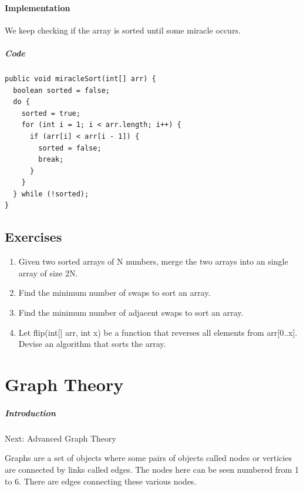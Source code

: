\documentclass[11pt,oneside]{book}
\begin{document}
\subsection{Implementation}

We keep checking if the array is sorted until some miracle occurs.

\subsubsection{Code}

\begin{lstlisting}
public void miracleSort(int[] arr) {
  boolean sorted = false;
  do {
    sorted = true;
    for (int i = 1; i < arr.length; i++) {
      if (arr[i] < arr[i - 1]) {
        sorted = false;
        break;
      }
    }
  } while (!sorted);
}
\end{lstlisting}

    \chapter{ Exercises }
    

\begin{enumerate}
\item Given two sorted arrays of N numbers, merge the two arrays into an single array of size 2N.
\item Find the minimum number of swaps to sort an array.
\item Find the minimum number of adjacent swaps to sort an array.
\item Let flip(int[] arr, int x) be a function that reverses all elements from arr[0..x]. Devise an algorithm that sorts the array.
\end{enumerate}

\part{ Graph Theory }
    \subsubsection{ Introduction }
    

Next: Advanced Graph Theory

Graphs are a set of objects where some pairs of objects  called nodes or verticies are connected by links called edges. The nodes here can be seen numbered from 1 to 6. There are edges connecting these various nodes.
\end{document}
